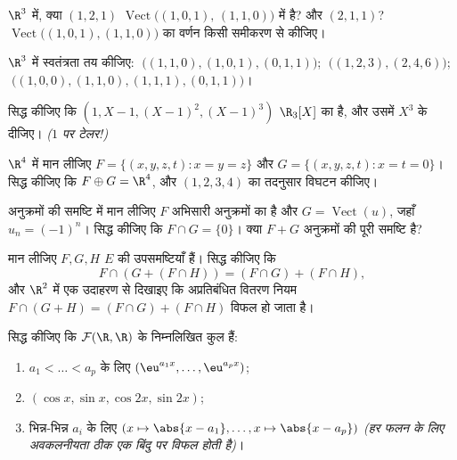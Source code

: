\begin{exercise}[$\star$]\label{exo:b1:vspaces:2}
$\R^3$ में, क्या $(1, 2, 1)$ $\operatorname{Vect}\bigl((1,0,1),\,
(1,1,0)\bigr)$ में है? और $(2, 1, 1)$?
$\operatorname{Vect}\bigl((1,0,1),(1,1,0)\bigr)$ का वर्णन किसी समीकरण से
कीजिए।
\end{exercise}

\begin{exercise}[$\star$]\label{exo:b1:vspaces:3}
$\R^3$ में स्वतंत्रता तय कीजिए: $\;\bigl((1,1,0), (1,0,1), (0,1,1)\bigr)$;
$\;\bigl((1,2,3), (2,4,6)\bigr)$; $\;\bigl((1,0,0), (1,1,0), (1,1,1),
(0,1,1)\bigr)$।
\end{exercise}

\begin{exercise}[$\star$]\label{exo:b1:vspaces:4}
सिद्ध कीजिए कि $(1, X - 1, (X-1)^2, (X-1)^3)$ $\R_3[X]$ का  है, और उसमें
$X^3$ के  दीजिए। \emph{($1$ पर टेलर!)}
\end{exercise}

\begin{exercise}[$\star\star$]\label{exo:b1:vspaces:5}
$\R^4$ में मान लीजिए $F = \{(x,y,z,t) : x = y = z\}$ और $G = \{(x,y,z,t) : x
= t = 0\}$। सिद्ध कीजिए कि $F \oplus G = \R^4$, और $(1,2,3,4)$ का तदनुसार
विघटन कीजिए।
\end{exercise}

\begin{exercise}[$\star\star$]\label{exo:b1:vspaces:6}
अनुक्रमों की समष्टि में मान लीजिए $F$ अभिसारी अनुक्रमों का  है और $G
= \operatorname{Vect}(u)$, जहाँ $u_n = (-1)^n$। सिद्ध कीजिए कि $F \cap G =
\{0\}$। क्या $F + G$ अनुक्रमों की पूरी समष्टि है?
\end{exercise}

\begin{exercise}[$\star\star$]\label{exo:b1:vspaces:7}
मान लीजिए $F, G, H$ $E$ की उपसमष्टियाँ हैं। सिद्ध कीजिए कि
\[
F \cap (G + (F \cap H)) = (F \cap G) + (F \cap H),
\]
और $\R^2$ में एक उदाहरण से दिखाइए कि अप्रतिबंधित वितरण नियम $F \cap (G + H)
= (F\cap G) + (F \cap H)$ विफल हो जाता है।
\end{exercise}

\begin{exercise}[$\star\star\star$]\label{exo:b1:vspaces:8}
सिद्ध कीजिए कि $\mathcal{F}(\R, \R)$ के निम्नलिखित कुल  हैं:
\begin{enumerate}
  \item $a_1 < \dots < a_p$ के लिए $(\eu^{a_1 x}, \dots, \eu^{a_p x})$;
  \item $(\cos x, \sin x, \cos 2x, \sin 2x)$;
  \item भिन्न-भिन्न $a_i$ के लिए $(x \mapsto \abs{x - a_1}, \dots, x \mapsto
  \abs{x - a_p})$ \emph{(हर फलन के लिए अवकलनीयता ठीक एक बिंदु पर विफल होती
  है)}।
\end{enumerate}
\end{exercise}

